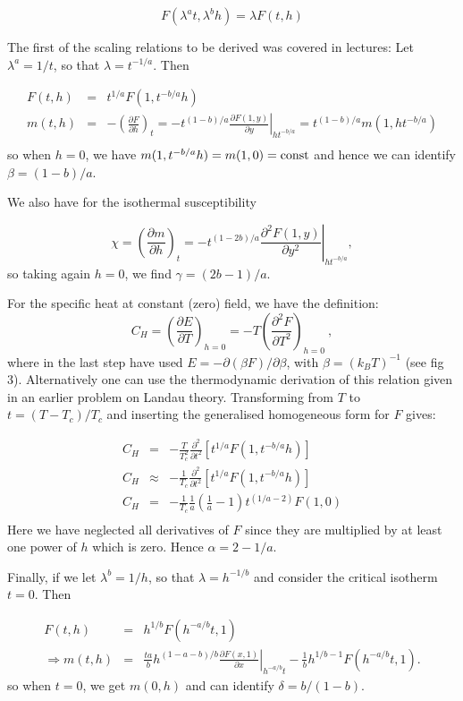 \documentclass[a4paper,12pt,twoside]{article}
\begin{document}
\begin{enumerate}
\[
F(\lambda^a t,\lambda^b h)=\lambda F(t,h) 
\]

The first of the scaling relations to be derived was covered in lectures:
Let $\lambda^a=1/t$, so that $\lambda=t^{-1/a}$. Then

\begin{eqnarray*}
F(t,h)&=&t^{1/a}F(1,t^{-b/a}h)\\
m(t,h)&=&-\left(\frac{\partial F}{\partial h}\right)_t= -t^{(1-b)/a} \left.\frac{\partial F(1,y)}{\partial y}\right|_{ht^{-b/a}}=t^{(1-b)/a}m(1,ht^{-b/a})\\
\end{eqnarray*}
so when $h=0$, we have $m(1,t^{-b/a}h)=m(1,0)={\rm const}$ and hence we can identify
$\boxed{\beta=(1-b)/a}$.

We also have for the isothermal susceptibility

\[
\chi=\left(\frac{\partial m}{\partial
h}\right)_t=-t^{(1-2b)/a}\left.\frac{\partial^2 F(1,y)}{\partial y^2}\right|_{ht^{-b/a}},
\]
so taking again $h=0$, we find $\boxed{\gamma=(2b-1)/a}$.

For the specific heat at constant (zero) field, we have the definition:
\[
C_H = \left(\frac{\partial E}{\partial T}\right)_{h=0}=-T\left(\frac{\partial^2F}{\partial T^2}\right)_{h=0}\:,
\]
where in the last step have used $E=-\partial (\beta F)/\partial\beta$, with $\beta=(k_BT)^{-1}$ (see fig 3). Alternatively one can use the thermodynamic derivation of this relation given in an earlier problem on Landau theory. Transforming from $T$ to $t=(T-T_c)/T_c$ and inserting the generalised homogeneous form for $F$ gives:

\begin{eqnarray*}
C_H &=& -\frac{T}{T_c^2}\frac{\partial^2}{\partial t^2}[t^{1/a}F(1,t^{-b/a}h)]\\
C_H &\approx& -\frac{1}{T_c}\frac{\partial^2}{\partial t^2}[t^{1/a}F(1,t^{-b/a}h)]\\
C_H &=& -\frac{1}{T_c}\frac{1}{a}(\frac{1}{a}-1)t^{(1/a-2)}F(1,0)\\
\end{eqnarray*}
Here we have neglected all derivatives of $F$ since they are multiplied
by at least one power of $h$ which is zero. Hence $\boxed{\alpha=2-1/a}$.

Finally, if we let $\lambda^b=1/h$, so that $\lambda=h^{-1/b}$ and
consider the critical isotherm $t=0$. Then

\begin{eqnarray*}
F(t,h)&=&h^{1/b}F(h^{-a/b}t,1)\\
\Rightarrow m(t,h)&=& \frac{ta}{b}h^{(1-a-b)/b}\left.\frac{\partial F(x,1)}{\partial x}\right|_{h^{-a/b}t}-\frac{1}{b}h^{1/b-1}F(h^{-a/b}t,1).
\end{eqnarray*}
so when $t=0$, we get $m(0,h)$ and can identify $\boxed{\delta=b/(1-b)}$.


\end{enumerate}
\end{document}
